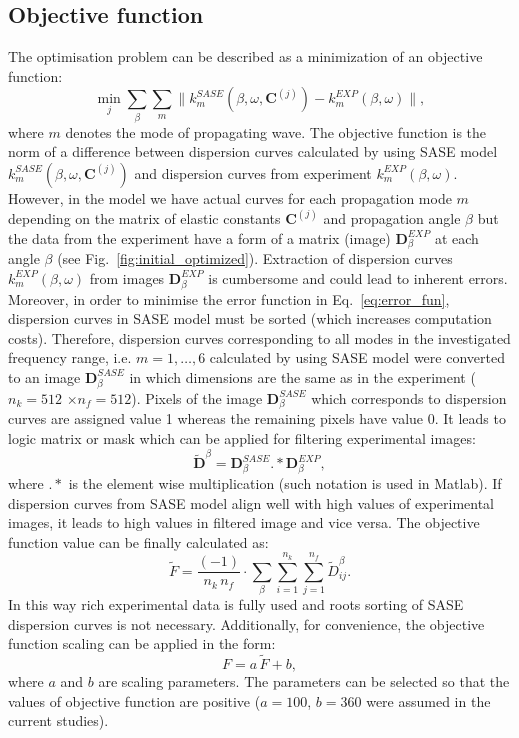 \documentclass[preprint,12pt]{elsarticle}
\newcommand{\matr}[1]{\mathbf{#1}} %
\begin{document}
	\subsection{Objective function}
	The optimisation problem can be described as a minimization of an objective function:
	\begin{equation}
	\min_j \sum_{\beta}\sum_{m} \| k^{SASE}_{m}(\beta, \omega,\matr{C}^{(j)}) -k^{EXP}_{m}(\beta,\omega) \|,
	\label{eq:error_fun}
	\end{equation}
	where $m$ denotes the mode of propagating wave.
	The objective function is the norm of a difference between dispersion curves calculated by using SASE model $k^{SASE}_{m}(\beta, \omega,\matr{C}^{(j)})$ and dispersion curves from experiment $k^{EXP}_{m}(\beta,\omega)$. However, in the model we have actual curves for each propagation mode $m$ depending on the matrix of elastic constants $\matr{C}^{(j)}$ and propagation angle $\beta$ but the data from the experiment have a form of a matrix (image) $\matr{D}^{EXP}_{\beta}$ at each angle $\beta$ (see Fig.~\ref{fig:initial_optimized}). Extraction of dispersion curves $k^{EXP}_{m}(\beta,\omega)$ from images $\matr{D}^{EXP}_{\beta}$ is cumbersome and could lead to inherent errors. Moreover, in order to minimise the error function in Eq.~\ref{eq:error_fun}, dispersion curves in SASE model must be sorted (which increases computation costs). Therefore, dispersion curves corresponding to all modes in the investigated frequency range, i.e. $m=1,\ldots, 6$ calculated by using SASE model were converted to an image $\matr{D}^{SASE}_{\beta} $ in which dimensions are the same as in the experiment ($n_k=512$ $\times$$n_f= 512$). Pixels of the image $\matr{D}^{SASE}_{\beta} $ which corresponds to dispersion curves are assigned value 1 whereas the remaining pixels have value 0. It leads to logic matrix or mask which can be applied for filtering experimental images: 
	\begin{equation}
		\tilde{\matr{D}}^{\beta} =  \matr{D}^{SASE}_{\beta}  .*    \matr{D}^{EXP}_{\beta} ,
		\label{eq:objective_fun}
   \end{equation}	
    where $.*$ is the element wise multiplication (such notation is used in Matlab). If dispersion curves from SASE model align well with high values of experimental images, it leads to high values in filtered image and vice versa.
	The objective function value can be finally calculated as: 
	\begin{equation}
	\tilde{F} = \frac{(-1)}{n_k \, n_f}  \cdot \sum_{\beta}  \sum_{i=1}^{n_k} \sum_{j=1}^{n_f}	\tilde{D}_{ij}^{\beta}. 
	\end{equation}
	In this way rich experimental data is fully used and roots sorting of SASE dispersion curves is not necessary. Additionally, for convenience, the objective function scaling can be applied in the form:
	\begin{equation}
	F = a \,  \tilde{F} + b,
	\end{equation}
	where $a$ and $b$ are scaling parameters. The parameters can be selected so that the values of objective function are positive ($a=100$, $b=360$ were assumed in the current studies).
	
\end{document}
